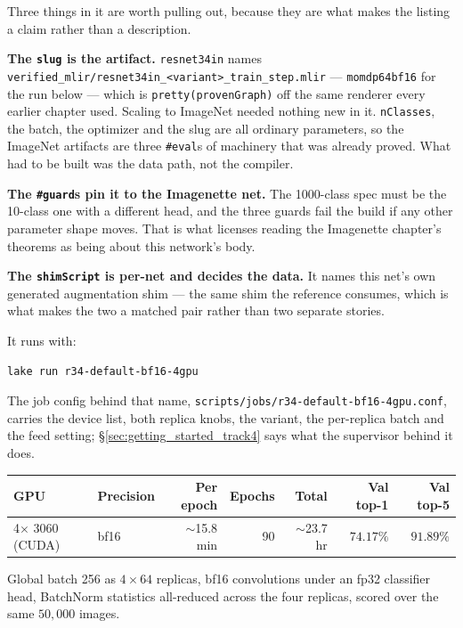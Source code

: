 \noindent Three things in it are worth pulling out, because they are what
makes the listing a claim rather than a description.

\textbf{The \texttt{slug} is the artifact.} \texttt{resnet34in} names
\texttt{verified\_mlir/resnet34in\_<variant>\_train\_step.mlir} ---
\texttt{momdp64bf16} for the run below --- which is
\texttt{pretty(provenGraph)} off the same renderer every earlier chapter used.
Scaling to ImageNet needed nothing new in it. \texttt{nClasses}, the batch, the
optimizer and the slug are all ordinary parameters, so the ImageNet artifacts
are three \texttt{\#eval}s of machinery that was already proved. What had to be
built was the data path, not the compiler.

\textbf{The \texttt{\#guard}s pin it to the Imagenette net.} The 1000-class
spec must be the 10-class one with a different head, and the three guards fail
the build if any other parameter shape moves. That is what licenses reading the
Imagenette chapter's theorems as being about this network's body.

\textbf{The \texttt{shimScript} is per-net and decides the data.} It names this
net's own generated augmentation shim --- the same shim the reference
consumes, which is what makes the two a matched pair rather than two
separate stories.

\medskip\noindent It runs with:

\begin{verbatim}
lake run r34-default-bf16-4gpu
\end{verbatim}

\noindent The job config behind that name,
\texttt{scripts/jobs/r34-default-bf16-4gpu.conf}, carries the device list,
both replica knobs, the variant, the per-replica batch and the feed setting;
\S\ref{sec:getting_started_track4} says what the supervisor behind it does.

\begin{center}
\begin{tabular}{l l r r r r r}
\hline
GPU & Precision & Per epoch & Epochs & Total & Val top-1 & Val top-5 \\
\hline
4$\times$ 3060 (CUDA) & bf16 & $\sim$15.8 min & 90 & $\sim$23.7 hr & $\mathbf{74.17\%}$ & $\mathbf{91.89\%}$ \\
\hline
\end{tabular}
\end{center}

\noindent Global batch 256 as $4 \times 64$ replicas, bf16 convolutions
under an fp32 classifier head, BatchNorm statistics all-reduced across
the four replicas, scored over the same $50{,}000$ images.


